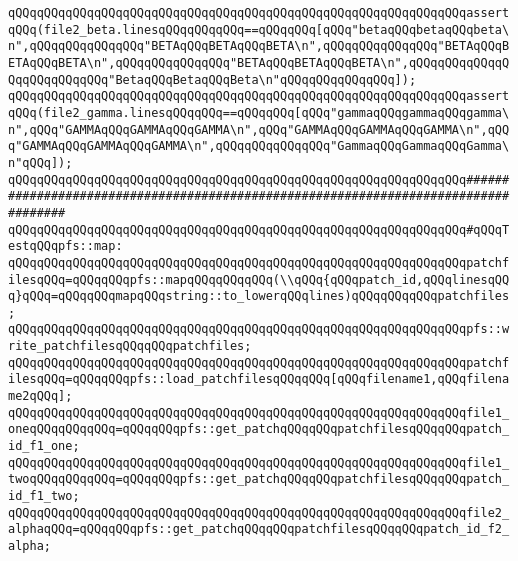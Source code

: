 \verb|qQQqqQQqqQQqqQQqqQQqqQQqqQQqqQQqqQQqqQQqqQQqqQQqqQQqqQQqqQQqqQQqassertqQQq(file2_beta.linesqQQqqQQqqQQq==qQQqqQQq[qQQq"betaqQQqbetaqQQqbeta\n",qQQqqQQqqQQqqQQq"BETAqQQqBETAqQQqBETA\n",qQQqqQQqqQQqqQQq"BETAqQQqBETAqQQqBETA\n",qQQqqQQqqQQqqQQq"BETAqQQqBETAqQQqBETA\n",qQQqqQQqqQQqqQQqqQQqqQQqqQQq"BetaqQQqBetaqQQqBeta\n"qQQqqQQqqQQqqQQq]);|\newline
\verb|qQQqqQQqqQQqqQQqqQQqqQQqqQQqqQQqqQQqqQQqqQQqqQQqqQQqqQQqqQQqqQQqassertqQQq(file2_gamma.linesqQQqqQQq==qQQqqQQq[qQQq"gammaqQQqgammaqQQqgamma\n",qQQq"GAMMAqQQqGAMMAqQQqGAMMA\n",qQQq"GAMMAqQQqGAMMAqQQqGAMMA\n",qQQq"GAMMAqQQqGAMMAqQQqGAMMA\n",qQQqqQQqqQQqqQQq"GammaqQQqGammaqQQqGamma\n"qQQq]);|\newline
\newline
\newline
\newline
\verb|qQQqqQQqqQQqqQQqqQQqqQQqqQQqqQQqqQQqqQQqqQQqqQQqqQQqqQQqqQQqqQQq####################################################################################|\newline
\verb|qQQqqQQqqQQqqQQqqQQqqQQqqQQqqQQqqQQqqQQqqQQqqQQqqQQqqQQqqQQqqQQq#qQQqTestqQQqpfs::map:|\newline
\newline
\verb|qQQqqQQqqQQqqQQqqQQqqQQqqQQqqQQqqQQqqQQqqQQqqQQqqQQqqQQqqQQqqQQqpatchfilesqQQq=qQQqqQQqpfs::mapqQQqqQQqqQQq(\\qQQq{qQQqpatch_id,qQQqlinesqQQq}qQQq=qQQqqQQqmapqQQqstring::to_lowerqQQqlines)qQQqqQQqqQQqpatchfiles;|\newline
\newline
\verb|qQQqqQQqqQQqqQQqqQQqqQQqqQQqqQQqqQQqqQQqqQQqqQQqqQQqqQQqqQQqqQQqpfs::write_patchfilesqQQqqQQqpatchfiles;|\newline
\newline
\verb|qQQqqQQqqQQqqQQqqQQqqQQqqQQqqQQqqQQqqQQqqQQqqQQqqQQqqQQqqQQqqQQqpatchfilesqQQq=qQQqqQQqpfs::load_patchfilesqQQqqQQq[qQQqfilename1,qQQqfilename2qQQq];|\newline
\newline
\verb|qQQqqQQqqQQqqQQqqQQqqQQqqQQqqQQqqQQqqQQqqQQqqQQqqQQqqQQqqQQqqQQqfile1_oneqQQqqQQqqQQq=qQQqqQQqpfs::get_patchqQQqqQQqpatchfilesqQQqqQQqpatch_id_f1_one;|\newline
\verb|qQQqqQQqqQQqqQQqqQQqqQQqqQQqqQQqqQQqqQQqqQQqqQQqqQQqqQQqqQQqqQQqfile1_twoqQQqqQQqqQQq=qQQqqQQqpfs::get_patchqQQqqQQqpatchfilesqQQqqQQqpatch_id_f1_two;|\newline
\newline
\verb|qQQqqQQqqQQqqQQqqQQqqQQqqQQqqQQqqQQqqQQqqQQqqQQqqQQqqQQqqQQqqQQqfile2_alphaqQQq=qQQqqQQqpfs::get_patchqQQqqQQqpatchfilesqQQqqQQqpatch_id_f2_alpha;|\newline

